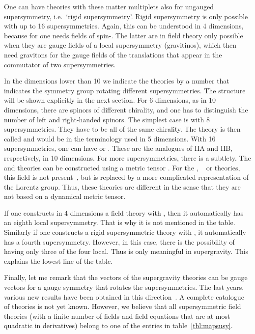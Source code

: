 \documentclass[a4paper,11pt,twoside]{article}
\providecommand{\ft}[2]{{\textstyle\frac{#1}{#2}}}
\begin{document}
One can have theories with these matter multiplets also for ungauged
supersymmetry, i.e.\ `rigid supersymmetry'. Rigid supersymmetry is only
possible with up to 16 supersymmetries. Again, this can be understood in
4 dimensions, because for \coordHE{} one needs fields of spin-\myHighlight{$\ft32$}\coordHE{}. The
latter are in field theory only possible when they are gauge fields of a
local supersymmetry (gravitinos), which then need gravitons for the gauge
fields of the translations that appear in the commutator of two
supersymmetries.

In the dimensions lower than 10 we indicate the theories by a number \coordHE{}
that indicates the symmetry group rotating different supersymmetries. The
structure will be shown explicitly in the next section. For 6 dimensions,
as in 10 dimensions, there are spinors of different chirality, and one
has to distinguish the number of left and right-handed spinors. The
simplest case is with 8 supersymmetries. They have to be all of the same
chirality. The theory is then called \coordHE{} and would be \coordHE{} in the
terminology used in 5 dimensions. With 16 supersymmetries, one can have
\coordHE{} or \coordHE{}. These are the analogues of IIA and IIB, respectively,
in 10 dimensions. For more supersymmetries, there is a subtlety. The
\coordHE{} and \coordHE{} theories can be constructed using a metric tensor
\coordHE{}. For the \coordHE{}, \coordHE{}~\cite{Townsend:1984xt} or
\coordHE{} theories, this field is not present~\cite{Hull:2000zn}, but is
replaced by a more complicated representation of the Lorentz group. Thus,
these theories are different in the sense that they are not based on a
dynamical metric tensor.

If one constructs in 4 dimensions a field theory with \coordHE{}, then it
automatically has an eighth local supersymmetry. That is why it is not
mentioned in the table. Similarly if one constructs a rigid
supersymmetric theory with \coordHE{}, it automatically has a fourth
supersymmetry. However, in this case, there is the possibility of having
only three of the four local. Thus \coordHE{} is only meaningful in
supergravity. This explains the lowest line of the table.

Finally, let me remark that the vectors of the supergravity theories can
be gauge vectors for a gauge symmetry that rotates the supersymmetries.
The last years, various new results have been obtained in this
direction~\cite{Gheerardyn:2001jj,Hull:2002wg,Bergshoeff:2002mb,%
Andrianopoli:2002mf,Hull:2002cv,Bergshoeff:2002nv,Alonso-Alberca:2002tb,%
deWit:2002vt}. A complete catalogue of theories is not yet known.
However, we believe that all supersymmetric field theories (with a finite
number of fields and field equations that are at most quadratic in
derivatives) belong to one of the entries in table~\ref{tbl:mapsusy}.
\end{document}
